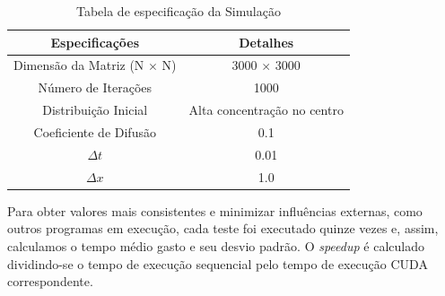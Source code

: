 \documentclass[12pt]{article}
\begin{document}
\begin{table}[ht]
  \centering
  \caption{Tabela de especificação da Simulação}
  \vspace{0.3cm}
  \begin{tabular}{||c c||}
    \hline
    Especificações                    & Detalhes                    \\ [0.5ex]
    \hline\hline
    Dimensão da Matriz (N $\times$ N) & 3000 $\times$ 3000          \\
    \hline
    Número de Iterações               & 1000                        \\
    \hline
    Distribuição Inicial              & Alta concentração no centro \\
    \hline
    Coeficiente de Difusão            & 0.1                         \\
    \hline
    $\Delta t$                        & 0.01                        \\
    \hline
    $\Delta x$                        & 1.0                         \\
    \hline
  \end{tabular}\label{tab:especificacaoSimulacao}
\end{table}

Para obter valores mais consistentes e minimizar influências externas, como
outros programas em execução, cada teste foi executado quinze vezes e, assim,
calculamos o tempo médio gasto e seu desvio padrão. O \textit{speedup} é
calculado dividindo-se o tempo de execução sequencial pelo tempo de execução
CUDA correspondente.
\end{document}

